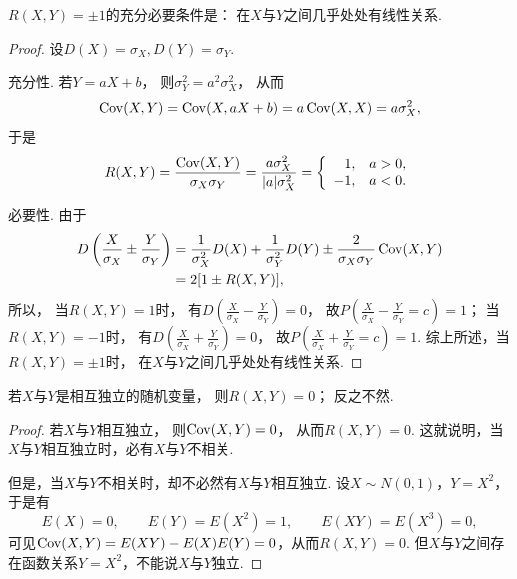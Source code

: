 \begin{theorem}
\(R(X,Y) = \pm1\)的充分必要条件是：
在\(X\)与\(Y\)之间几乎处处有线性关系.
\begin{proof}
设\(D(X) = \sigma_X,
D(Y) = \sigma_Y\).

充分性.
若\(Y=aX+b\)，
则\(\sigma_Y^2=a^2\sigma_X^2\)，
从而\begin{equation*}
	\operatorname{Cov}(X,Y)
	= \operatorname{Cov}(X,aX+b)
	= a\operatorname{Cov}(X,X)
	= a\sigma_X^2,
\end{equation*}
于是\begin{equation*}
	R(X,Y)
	= \frac{\operatorname{Cov}(X,Y)}{\sigma_X \sigma_Y}
	= \frac{a \sigma_X^2}{\abs{a} \sigma_X^2}
	= \left\{ \begin{array}{rl}
		1, & a>0, \\
		-1, & a<0.
	\end{array} \right.
\end{equation*}

必要性.
由于\begin{align*}
	D\left(\frac{X}{\sigma_X} \pm \frac{Y}{\sigma_Y}\right)
	&= \frac1{\sigma_X^2} D(X) + \frac1{\sigma_Y^2} D(Y)
		\pm \frac2{\sigma_X \sigma_Y} \operatorname{Cov}(X,Y) \\
	&= 2[1 \pm R(X,Y)],
\end{align*}
所以，
当\(R(X,Y)=1\)时，
有\(D\left(\frac{X}{\sigma_X} - \frac{Y}{\sigma_Y}\right) = 0\)，
故\(P\left(\frac{X}{\sigma_X} - \frac{Y}{\sigma_Y} = c\right) = 1\)；
当\(R(X,Y)=-1\)时，
有\(D\left(\frac{X}{\sigma_X} + \frac{Y}{\sigma_Y}\right) = 0\)，
故\(P\left(\frac{X}{\sigma_X} + \frac{Y}{\sigma_Y} = c\right) = 1\).
综上所述，当\(R(X,Y)=\pm1\)时，
在\(X\)与\(Y\)之间几乎处处有线性关系.
\end{proof}
\end{theorem}

\begin{theorem}\label{theorem:相关系数.两个独立随机变量的相关系数等于零}
若\(X\)与\(Y\)是相互独立的随机变量，
则\(R(X,Y)=0\)；
反之不然.
\begin{proof}
若\(X\)与\(Y\)相互独立，
则\(\operatorname{Cov}(X,Y)=0\)，
从而\(R(X,Y)=0\).
这就说明，当\(X\)与\(Y\)相互独立时，必有\(X\)与\(Y\)不相关.

但是，当\(X\)与\(Y\)不相关时，却不必然有\(X\)与\(Y\)相互独立.
设\(X \sim N(0,1)\)，\(Y=X^2\)，
于是有\begin{equation*}
    E(X) = 0,
    \qquad
    E(Y) = E(X^2) = 1,
    \qquad
    E(XY) = E(X^3) = 0,
\end{equation*}
可见\(\operatorname{Cov}(X,Y) = E(XY) - E(X) E(Y) = 0\)，从而\(R(X,Y) = 0\).
但\(X\)与\(Y\)之间存在函数关系\(Y=X^2\)，不能说\(X\)与\(Y\)独立.
\end{proof}
\end{theorem}



